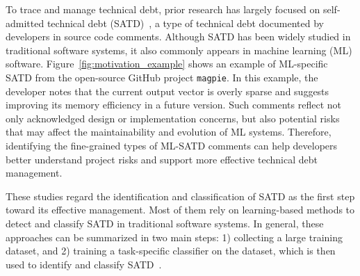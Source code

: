 \documentclass[acmsmall,screen,review,anonymous]{acmart}
\begin{document}




To trace and manage technical debt, prior research has largely focused on self-admitted technical debt (SATD)~\cite{potdar2014exploratory}, a type of technical debt documented by developers in source code comments. Although SATD has been widely studied in traditional software systems, it also commonly appears in machine learning (ML) software. Figure~\ref{fig:motivation_example} shows an example of ML-specific SATD from the open-source GitHub project \texttt{magpie}. In this example, the developer notes that the current output vector is overly sparse and suggests improving its memory efficiency in a future version. Such comments reflect not only acknowledged design or implementation concerns, but also potential risks that may affect the maintainability and evolution of ML systems. Therefore, identifying the fine-grained types of ML-SATD comments can help developers better understand project risks and support more effective technical debt management.



These studies regard the identification and classification of SATD as the first step toward its effective management. Most of them rely on learning-based methods to detect and classify SATD in traditional software systems. In general, these approaches can be summarized in two main steps: 1) collecting a large training dataset, and 2) training a task-specific classifier on the dataset, which is then used to identify and classify SATD~\cite{wattanakriengkrai2019automatic, chen2021multiclass}.
\end{document}
